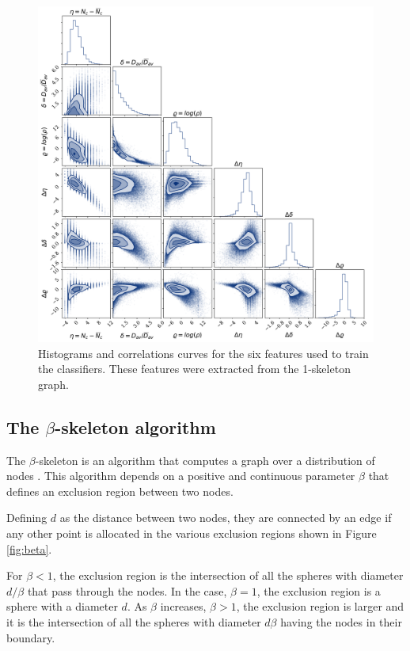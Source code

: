 \documentclass[usenatbib]{mnras}
\begin{document}
\begin{figure}
        \includegraphics[scale=0.46]{Figs/p_all_features_correlations.pdf}
    \caption{Histograms and correlations curves for the six features
      used to train the classifiers. These features were extracted from the 1-skeleton graph.}
    \label{fig:features}
\end{figure}

\subsection{The $\beta$-skeleton algorithm}


The $\beta$-skeleton is an algorithm that computes a graph over a
distribution of nodes \citep{Kirkpatrick1985, Fang2019}.  
This algorithm depends on a positive and continuous parameter $\beta$
that defines an exclusion region between two nodes.

Defining $d$ as the distance between two nodes, they are connected by
an edge if any other point is allocated in the various exclusion
regions shown in Figure \ref{fig:beta}.  

For $\beta<1$, the exclusion region is the intersection of all the 
spheres with diameter $d/\beta$ that pass through the nodes. In the
case, $\beta=1$, the exclusion region is a sphere with a diameter $d$.
As $\beta$ increases, $\beta>1$, the exclusion region is larger and it
is the intersection of all the spheres with diameter $d\beta$ having
the nodes in their boundary.  
\end{document}
